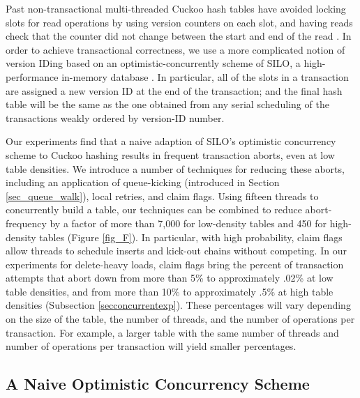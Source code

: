 \documentclass{sig-alternate-05-2015}
\begin{document}
Past non-transactional multi-threaded Cuckoo hash tables have avoided
locking slots for read operations by using version counters on each
slot, and having reads check that the counter did not change between
the start and end of the read \cite{fan13, li14}. In order to achieve
transactional correctness, we use a more complicated notion of version
IDing based on an optimistic-concurrently scheme of SILO, a
high-performance in-memory database \cite{silo13}. In particular, all
of the slots in a transaction are assigned a new version ID at the end
of the transaction; and the final hash table will be the same as the
one obtained from any serial scheduling of the transactions weakly
ordered by version-ID number.

Our experiments find that a naive adaption of SILO's optimistic
concurrency scheme to Cuckoo hashing results in frequent transaction
aborts, even at low table densities. We introduce a number of
techniques for reducing these aborts, including an application of
queue-kicking (introduced in Section \ref{sec_queue_walk}), local
retries, and claim flags. Using fifteen threads to concurrently build
a table, our techniques can be combined to reduce abort-frequency by a
factor of more than 7,000 for low-density tables and 450 for
high-density tables (Figure \ref{fig_F}). In particular, with high
probability, claim flags allow threads to schedule inserts and
kick-out chains without competing. In our experiments for delete-heavy
loads, claim flags bring the percent of transaction attempts that
abort down from more than 5\% to approximately .02\% at low table
densities, and from more than 10\% to approximately .5\% at high table
densities (Subsection \ref{secconcurrentexp}). These percentages will
vary depending on the size of the table, the number of threads, and
the number of operations per transaction. For example, a larger table
with the same number of threads and number of operations per
transaction will yield smaller percentages.


















\subsection{A Naive Optimistic Concurrency Scheme}
\end{document}
